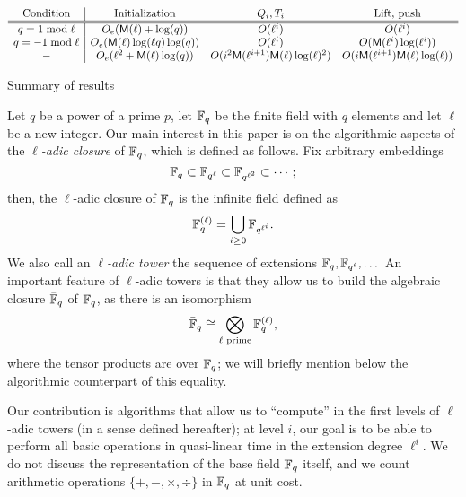 \documentclass{sig-alternate}
\begin{document}
\begin{table*}[!t]
$$
\begin{array}{c|cccc}
  \text{Condition} & \text{Initialization} & Q_i, T_i & \text{Lift, push}\\
  \hline \hline
  q = 1 \bmod \ell & O_e(\mathsf{M}(\ell) + \log(q))  & O(\ell^i) & O(\ell^i) \\
  q = -1 \bmod \ell & O_e(\mathsf{M}(\ell) \log(\ell q)\log(q)) & O(\ell^i) & O(\mathsf{M}(\ell^i) \log(\ell^i)) \\
  - & O_e (\ell^2+\mathsf{M}(\ell) \log(q)) & O(i^2\mathsf{M}(\ell^{i+1})\mathsf{M}(\ell)\log(\ell)^2) & O(i \mathsf{M}(\ell^{i+1})\mathsf{M}(\ell)\log(\ell))
\end{array}
$$
\label{table:main}
\caption{Summary of results}
\end{table*}

Let $q$ be a power of a prime $p$, let $\mathbb{F}_q$ be the finite field with
$q$ elements and let $\ell$ be a new integer. Our main interest in
this paper is on the algorithmic aspects of the \emph{$\ell$-adic
  closure} of $\mathbb{F}_q$, which is defined as follows. Fix arbitrary
embeddings
\begin{equation*}
  \mathbb{F}_q \subset \mathbb{F}_{q^\ell} \subset \mathbb{F}_{q^{\ell^2}} \subset \cdots;
\end{equation*}
then, the $\ell$-adic closure of $\mathbb{F}_q$ is the infinite field defined as
\begin{equation*}
  \mathbb{F}_q^{(\ell)} = \bigcup_{i\ge 0}\mathbb{F}_{q^{\ell^i}}.
\end{equation*}
We also call an \emph{$\ell$-adic tower} the sequence of extensions
$\mathbb{F}_q,\mathbb{F}_{q^\ell},\dots$ An important feature of $\ell$-adic towers is
that they allow us to build the algebraic closure $\bar{\mathbb{F}}_q$ of
$\mathbb{F}_q$, as there is an isomorphism
\begin{equation}
  \label{eq:tensor}
  \bar{\mathbb{F}}_q \cong \bigotimes_{\ell\text{ prime}} \mathbb{F}_q^{(\ell)},
\end{equation}
where the tensor products are over $\mathbb{F}_q$; we will briefly mention
below the algorithmic counterpart of this equality.

Our contribution is algorithms that allow us to ``compute'' in the
first levels of $\ell$-adic towers (in a sense defined hereafter); at
level $i$, our goal is to be able to perform all basic operations in
quasi-linear time in the extension degree $\ell^i$.  We do not discuss
the representation of the base field $\mathbb{F}_q$ itself, and we count
arithmetic operations $\{+,-,\times,\div\}$ in $\mathbb{F}_q$ at unit cost.
\end{document}
